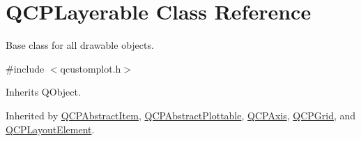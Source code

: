 \hypertarget{class_q_c_p_layerable}{\section{Q\-C\-P\-Layerable Class Reference}
\label{class_q_c_p_layerable}
}


Base class for all drawable objects.  




{\ttfamily \#include $<$qcustomplot.\-h$>$}



Inherits Q\-Object.



Inherited by \hyperlink{class_q_c_p_abstract_item}{Q\-C\-P\-Abstract\-Item}, \hyperlink{class_q_c_p_abstract_plottable}{Q\-C\-P\-Abstract\-Plottable}, \hyperlink{class_q_c_p_axis}{Q\-C\-P\-Axis}, \hyperlink{class_q_c_p_grid}{Q\-C\-P\-Grid}, and \hyperlink{class_q_c_p_layout_element}{Q\-C\-P\-Layout\-Element}.


